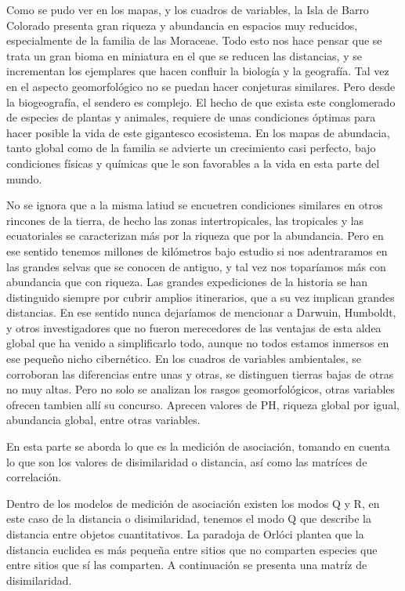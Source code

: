 \documentclass[11pt,]{article}
\begin{document}
Como se pudo ver en los mapas, y los cuadros de variables, la Isla de
Barro Colorado presenta gran riqueza y abundancia en espacios muy
reducidos, especialmente de la familia de las Moraceae. Todo esto nos
hace pensar que se trata un gran bioma en miniatura en el que se reducen
las distancias, y se incrementan los ejemplares que hacen confluir la
biología y la geografía. Tal vez en el aspecto geomorfológico no se
puedan hacer conjeturas similares. Pero desde la biogeografía, el
sendero es complejo. El hecho de que exista este conglomerado de
especies de plantas y animales, requiere de unas condiciones óptimas
para hacer posible la vida de este gigantesco ecosistema. En los mapas
de abundacia, tanto global como de la familia se advierte un crecimiento
casi perfecto, bajo condiciones físicas y químicas que le son favorables
a la vida en esta parte del mundo.

No se ignora que a la misma latiud se encuetren condiciones similares en
otros rincones de la tierra, de hecho las zonas intertropicales, las
tropicales y las ecuatoriales se caracterizan más por la riqueza que por
la abundancia. Pero en ese sentido tenemos millones de kilómetros bajo
estudio si nos adentraramos en las grandes selvas que se conocen de
antiguo, y tal vez nos toparíamos más con abundancia que con riqueza.
Las grandes expediciones de la historia se han distinguido siempre por
cubrir amplios itinerarios, que a su vez implican grandes distancias. En
ese sentido nunca dejaríamos de mencionar a Darwuin, Humboldt, y otros
investigadores que no fueron merecedores de las ventajas de esta aldea
global que ha venido a simplificarlo todo, aunque no todos estamos
inmersos en ese pequeño nicho cibernético. En los cuadros de variables
ambientales, se corroboran las diferencias entre unas y otras, se
distinguen tierras bajas de otras no muy altas. Pero no solo se analizan
los rasgos geomorfológicos, otras variables ofrecen tambien allí su
concurso. Aprecen valores de PH, riqueza global por igual, abundancia
global, entre otras variables.

En esta parte se aborda lo que es la medición de asociación, tomando en
cuenta lo que son los valores de disimilaridad o distancia, así como las
matríces de correlación.

Dentro de los modelos de medición de asociación existen los modos Q y R,
en este caso de la distancia o disimilaridad, tenemos el modo Q que
describe la distancia entre objetos cuantitativos. La paradoja de Orlóci
plantea que la distancia euclidea es más pequeña entre sitios que no
comparten especies que entre sitios que sí las comparten. A continuación
se presenta una matríz de disimilaridad.
\end{document}
